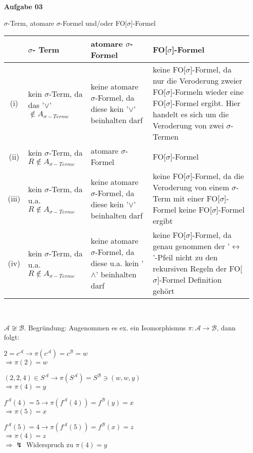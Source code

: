 \documentclass[a4paper,10pt]{article}
\begin{document}
	\textbf{Aufgabe 03}\\
	\begin{compactenum} [(a)]
		\item $ \sigma $-Term, atomare $ \sigma $-Formel und/oder FO[$ \sigma $]-Formel \\
		
		\begin{tabular}  {c|L{4cm}|L{5cm}|L{5cm}}
			&$ \sigma $- Term & atomare $ \sigma $-Formel & FO[$ \sigma $]-Formel\\ \hline
			(i) & kein $ \sigma $-Term, da das '$ \vee $'$ \not\in A_{\sigma -Terme}$ & keine atomare $ \sigma $-Formel, da diese kein '$ \vee $' beinhalten darf & keine FO[$ \sigma $]-Formel, da nur die Veroderung zweier FO[$ \sigma $]-Formeln wieder eine FO[$ \sigma $]-Formel ergibt. Hier handelt es sich um die Veroderung von zwei $ \sigma $-Termen \\ \hline
			(ii) & kein $ \sigma $-Term, da $ R \not\in A_{\sigma -Terme}$ & atomare $ \sigma $-Formel & FO[$ \sigma $]-Formel \\ \hline
			(iii) & kein $ \sigma $-Term, da u.a. $ R \not\in A_{\sigma -Terme}$ & keine atomare $ \sigma $-Formel, da diese kein '$ \vee $' beinhalten darf & keine FO[$ \sigma $]-Formel, da die Veroderung von einem $ \sigma $-Term mit einer FO[$ \sigma $]-Formel keine FO[$ \sigma $]-Formel ergibt \\ \hline
			(iv) & kein $ \sigma $-Term, da u.a. $ R \not\in A_{\sigma -Terme}$ & keine atomare $ \sigma $-Formel, da diese u.a. kein '$ \wedge $' beinhalten darf & keine FO[$ \sigma $]-Formel, da genau genommen der '$ \leftrightarrow $'-Pfeil nicht zu den rekursiven Regeln der FO[$ \sigma $]-Formel Definition gehört 
		\end{tabular} \\
		
		\item \begin{compactitem}
			\item $ \mathcal{A} \not\cong \mathcal{B} $. Begründung: Angenommen es ex. ein Isomorphismus $ \pi : \mathcal{A} \rightarrow \mathcal{B} $, dann folgt: \\
			\begin{compactitem}
				\item $ 2 = c^\mathcal{A} \rightarrow \pi(c^\mathcal{A}) = c^\mathcal{B} = w$\\
				$ \Rightarrow \pi(2) = w $
				\item $ (2,2,4) \in S^\mathcal{A} \rightarrow \pi(S^\mathcal{A}) = S^\mathcal{B} \ni (w,w,y)$ \\
				$ \Rightarrow \pi(4) = y $
				\item $ f^\mathcal{A}(4) = 5 \rightarrow \pi(f^\mathcal{A}(4)) = f^\mathcal{B}(y) = x $ \\
				$ \Rightarrow \pi(5) = x $
				\item $ f^\mathcal{A}(5) = 4 \rightarrow \pi(f^\mathcal{A}(5)) = f^\mathcal{B}(x) = z $ \\
				$ \Rightarrow \pi(4) = z $\\
				$ \Longrightarrow \lightning$ Widerspruch zu $ \pi(4) = y $
				

\end{compactitem}
\end{compactitem}
\end{compactenum}
\end{document}
